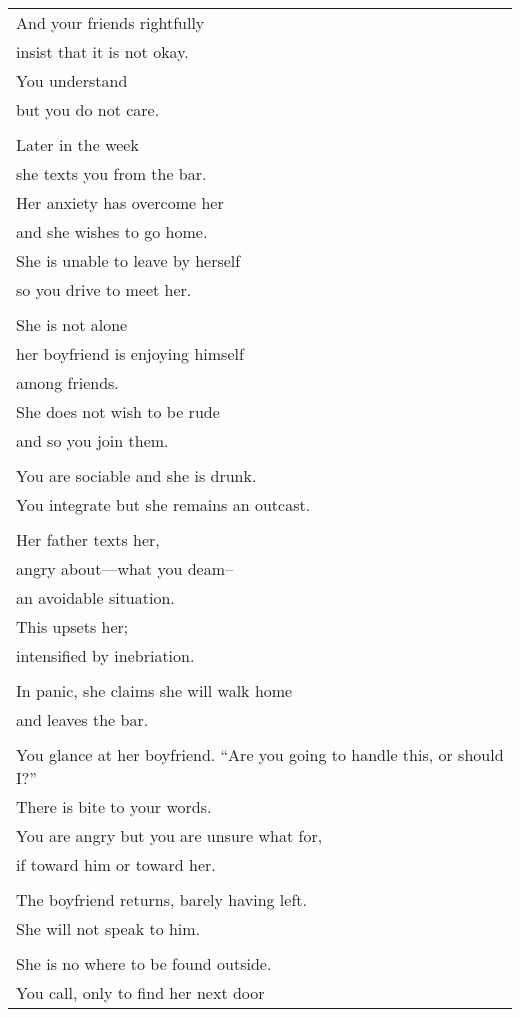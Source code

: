 \documentclass{article}
\begin{document}
\begin{center}
\begin{longtable}{l}
And your friends rightfully \\
insist that it is not okay. \\
You understand \\
but you do not care. \\
\\
Later in the week \\
she texts you from the bar. \\
Her anxiety has overcome her \\
and she wishes to go home. \\
She is unable to leave by herself \\
so you drive to meet her. \\
\\
She is not alone \\
her boyfriend is enjoying himself \\
among friends. \\
She does not wish to be rude \\
and so you join them. \\
\\
You are sociable and she is drunk. \\
You integrate but she remains an outcast. \\
\\
Her father texts her, \\
angry about---what you deam--\\
an avoidable situation. \\
This upsets her; \\
intensified by inebriation. \\
\\
In panic, she claims she will walk home \\
and leaves the bar. \\
\\
You glance at her boyfriend.
``Are you going to handle this, or should I?'' \\
There is bite to your words. \\
You are angry but you are unsure what for, \\
if toward him or toward her. \\
\\
The boyfriend returns, barely having left. \\
She will not speak to him. \\
\\
She is no where to be found outside. \\
You call, only to find her next door \\

\end{longtable}
\end{center}
\end{document}
